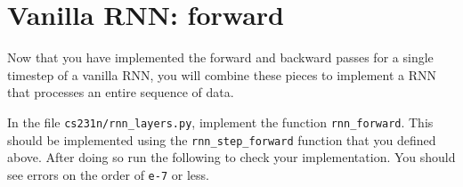\documentclass[11pt]{article}
\begin{document}
    \hypertarget{vanilla-rnn-forward}{%
\section{Vanilla RNN: forward}\label{vanilla-rnn-forward}}

Now that you have implemented the forward and backward passes for a
single timestep of a vanilla RNN, you will combine these pieces to
implement a RNN that processes an entire sequence of data.

In the file \texttt{cs231n/rnn\_layers.py}, implement the function
\texttt{rnn\_forward}. This should be implemented using the
\texttt{rnn\_step\_forward} function that you defined above. After doing
so run the following to check your implementation. You should see errors
on the order of \texttt{e-7} or less.
\end{document}
